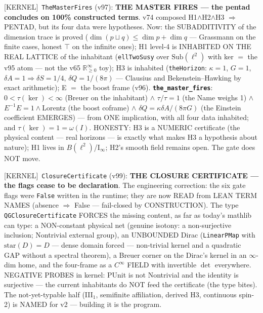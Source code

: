 \documentclass[11pt]{article}
\providecommand{\kernelmk}[1]{\textsf{[KERNEL]}~\texttt{#1}}\providecommand{\knownmk}[1]{\textsf{[KNOWN]}~{#1}}\providecommand{\statusmk}[1]{\textsf{[#1]}}
\theoremstyle{definition}\newtheorem{deriv}{Derivation}
\begin{document}
\kernelmk{TheMasterFires} (v97): \textbf{THE MASTER FIRES --- the pentad concludes on 100\% constructed terms}. v74 composed H1$\wedge$H2$\wedge$H3 $\Rightarrow$ PENTAD, but its four data were hypotheses. Now: the SUBADDITIVITY of the dimension trace is proved ($\dim(p\sqcup q)\le\dim p+\dim q$ --- Grassmann on the finite cases, honest $\top$ on the infinite ones); H1 level-4 is INHABITED ON THE REAL LATTICE of the inhabitant (\texttt{ellTwoSusy} over $\mathrm{Sub}(\ell^2)$ with ker $=$ the v95 atom --- not the v65 $\mathbb R_{\ge0}^\infty$ toy); H3 is inhabited (\texttt{theHorizon}: $\kappa=1$, $G=1$, $\delta A=1\Rightarrow\delta S=1/4$, $\delta Q=1/(8\pi)$ --- Clausius and Bekenstein--Hawking by exact arithmetic); E $=$ the boost frame (v96). \textbf{\texttt{the\_master\_fires}}: $0<\tau(\ker)<\infty$ (Breuer on the inhabitant) $\wedge$ $\tau/\tau=1$ (the Name weighs 1) $\wedge$ $E^{-1}E=1\wedge$Lorentz (the boost coframe) $\wedge$ $\delta Q=\kappa\delta A/(8\pi G)$ (the Einstein coefficient EMERGES) --- from ONE implication, with all four data inhabited; and $\tau(\ker)=1=\omega(I)$. HONESTY: H3 is a NUMERIC certificate (the physical content --- real horizons --- is exactly what makes H3 a hypothesis about nature); H1 lives in $B(\ell^2)$/I$_\infty$; H2's smooth field remains open. The gate does NOT move.

\kernelmk{ClosureCertificate} (v99): \textbf{THE CLOSURE CERTIFICATE --- the flags cease to be declaration}. The engineering correction: the six gate flags were \texttt{False} written in the runtime; they are now READ from LEAN TERM NAMES (absence $\Rightarrow$ False --- fail-closed by CONSTRUCTION). The type \texttt{QGClosureCertificate} FORCES the missing content, as far as today's mathlib can type: a NON-constant physical net (genuine isotony: a non-surjective inclusion; Nontrivial external group), an UNBOUNDED Dirac (\texttt{LinearPMap} with $\mathrm{star}(D)=D$ --- dense domain forced --- non-trivial kernel and a quadratic GAP without a spectral theorem), a Breuer corner on the Dirac's kernel in an $\infty$-dim home, and the four-frame as a $C^\infty$ FIELD with invertible $\det$ everywhere. NEGATIVE PROBES in kernel: PUnit is not Nontrivial and the identity is surjective --- the current inhabitants do NOT feed the certificate (the type bites). The not-yet-typable half (III$_1$, semifinite affiliation, derived H3, continuous spin-2) is NAMED for v2 --- building it is the program.
\end{document}
